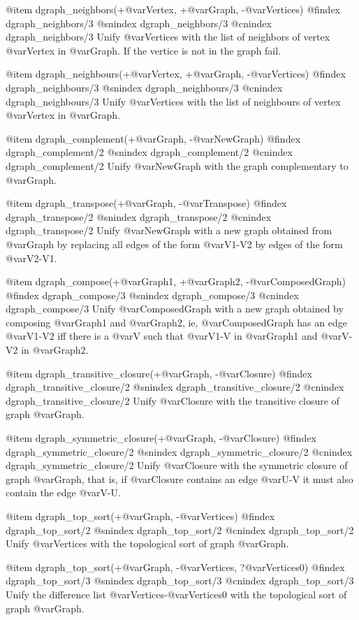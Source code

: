 {{{{{{{{{@item dgraph_neighbors(+@var{Vertex}, +@var{Graph}, -@var{Vertices})
@findex  dgraph_neighbors/3
@snindex dgraph_neighbors/3
@cnindex dgraph_neighbors/3
Unify @var{Vertices} with the list of neighbors of vertex @var{Vertex}
in @var{Graph}. If the vertice is not in the graph fail.

@item dgraph_neighbours(+@var{Vertex}, +@var{Graph}, -@var{Vertices})
@findex  dgraph_neighbours/3
@snindex dgraph_neighbours/3
@cnindex dgraph_neighbours/3
Unify @var{Vertices} with the list of neighbours of vertex @var{Vertex}
in @var{Graph}.

@item dgraph_complement(+@var{Graph}, -@var{NewGraph})
@findex  dgraph_complement/2
@snindex dgraph_complement/2
@cnindex dgraph_complement/2
Unify @var{NewGraph} with the graph complementary to @var{Graph}.

@item dgraph_transpose(+@var{Graph}, -@var{Transpose})
@findex  dgraph_transpose/2
@snindex dgraph_transpose/2
@cnindex dgraph_transpose/2
Unify @var{NewGraph} with a new graph obtained from @var{Graph} by
replacing all edges of the form @var{V1-V2} by edges of the form
@var{V2-V1}. 

@item dgraph_compose(+@var{Graph1}, +@var{Graph2}, -@var{ComposedGraph})
@findex  dgraph_compose/3
@snindex dgraph_compose/3
@cnindex dgraph_compose/3
Unify @var{ComposedGraph} with a new graph obtained by composing
@var{Graph1} and @var{Graph2}, ie, @var{ComposedGraph} has an edge
@var{V1-V2} iff there is a @var{V} such that @var{V1-V} in @var{Graph1}
and @var{V-V2} in @var{Graph2}.

@item dgraph_transitive_closure(+@var{Graph}, -@var{Closure})
@findex  dgraph_transitive_closure/2
@snindex dgraph_transitive_closure/2
@cnindex dgraph_transitive_closure/2
Unify @var{Closure} with the transitive closure of graph @var{Graph}.

@item dgraph_symmetric_closure(+@var{Graph}, -@var{Closure})
@findex  dgraph_symmetric_closure/2
@snindex dgraph_symmetric_closure/2
@cnindex dgraph_symmetric_closure/2
Unify @var{Closure} with the symmetric closure of graph @var{Graph},
that is,  if @var{Closure} contains an edge @var{U-V} it must also
contain the edge @var{V-U}.

@item dgraph_top_sort(+@var{Graph}, -@var{Vertices})
@findex  dgraph_top_sort/2
@snindex dgraph_top_sort/2
@cnindex dgraph_top_sort/2
Unify @var{Vertices} with the topological sort of graph @var{Graph}.

@item dgraph_top_sort(+@var{Graph}, -@var{Vertices}, ?@var{Vertices0})
@findex  dgraph_top_sort/3
@snindex dgraph_top_sort/3
@cnindex dgraph_top_sort/3
Unify the difference list @var{Vertices}-@var{Vertices0} with the
topological sort of graph @var{Graph}.

}}}}}}}}}
